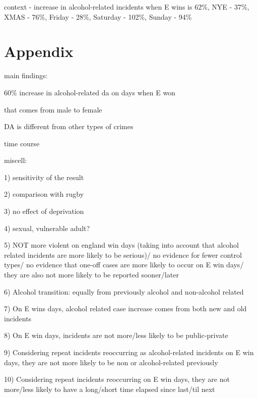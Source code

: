 \documentclass[12pt, letterpaper]{article}
\begin{document}
context - increase in alcohol-related incidents when E wins is 62\%, NYE - 37\%, XMAS - 76\%, Friday - 28\%, Saturday - 102\%, Sunday - 94\%


\section{Appendix}

main findings:

60\% increase in alcohol-related da on days when E won

that comes from male to female

DA is different from other types of crimes

time course

miscell:

1) sensitivity of the result

2) comparison with rugby 

3) no effect of deprivation

4) sexual, vulnerable adult?

5) NOT more violent on england win days (taking into account that alcohol related incidents are more likely to be serious)/ no evidence for fewer control types/ no evidence that one-off cases are more likely to occur on E win days/ they are also not more likely to be reported sooner/later

6) Alcohol transition: equally from previously alcohol and non-alcohol related

7) On E wins days, alcohol related case increase comes from both new and old incidents

8) On E win days, incidents are not more/less likely to be public-private

9) Considering repeat incidents reoccurring as alcohol-related incidents on E win days, they are not more likely to be non or alcohol-related previously

10) Considering repeat incidents reoccurring on E win days, they are not more/less likely to have a long/short time elapsed since last/til next


%

\newpage

%

\printbibliography
\end{document}
